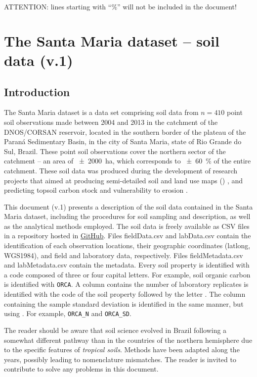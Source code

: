 ATTENTION: lines starting with “\%”  will not be included in the document!
\artigofalse
\chapter{The Santa Maria dataset -- soil data (v.1)}
\label{apen:soil-data}

\tocless\section{Introduction}

The Santa Maria dataset is a data set comprising soil data from $n = 410$ point soil observations 
made between 2004 and 2013 in the catchment of the DNOS/CORSAN reservoir, located in the southern 
border of the plateau of the Paraná Sedimentary Basin, in the city of Santa Maria, state of Rio 
Grande do Sul, Brazil. These point soil observations cover the northern sector of the catchment -- 
an area of \SI{\pm2000}{\hectare}, which corresponds to \SI{\pm60}{\percent} of the entire 
catchment. These soil data was produced during the development of research projects that aimed at 
producing semi-detailed soil and land use maps () 
\cite{Pedron2005,Miguel2010,SamuelRosaEtAl2011a,MiguelEtAl2012}, and predicting topsoil carbon 
stock and vulnerability to erosion \cite{Samuel-Rosa2009,MouraBueno2012,Miguel2013}.

This document (v.1) presents a description of the soil data contained in the Santa Maria dataset, 
including the procedures for soil sampling and description, as well as the analytical methods 
employed. The soil data is freely available as CSV files in a repository hosted in
\href{https://github.com/samuel-rosa/dnos-sm-rs-general/tree/master/data}{GitHub}. Files 
fieldData.csv and labData.csv contain the identification of each observation locations, their 
geographic coordinates (latlong, WGS1984), and field and laboratory data, respectively. Files 
fieldMetadata.csv and labMetadata.csv contain the metadata. Every soil property is identified with a 
code composed of three or four capital letters. For example, soil organic carbon is identified with 
\texttt{ORCA}. A column contains the number of laboratory replicates is identified with the code of 
the soil property followed by the letter . The column containing the sample standard deviation 
is identified in the same manner, but using . For example, \texttt{ORCA\_N} and \texttt{ORCA\_SD}.

The reader should be aware that soil science evolved in Brazil following a somewhat different 
pathway than in the countries of the northern hemisphere due to the specific features of 
\emph{tropical soils}. Methods have been adapted along the years, possibly leading to nomenclature 
mismatches. The reader is invited to contribute to solve any problems in this document.

